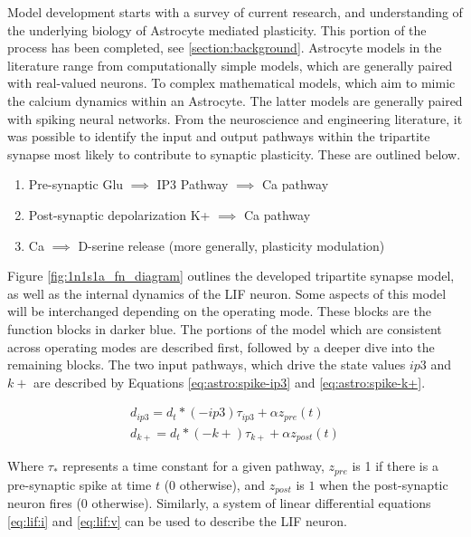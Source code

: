     Model development starts with a survey of current research, and
    understanding of the underlying biology of Astrocyte mediated
    plasticity. This portion of the process has been completed, see
    \ref{section:background}. Astrocyte models in the literature range from
    computationally simple models, which are generally paired with real-valued
    neurons. To complex mathematical models, which aim to mimic the calcium
    dynamics within an Astrocyte. The latter models are generally paired with
    spiking neural networks. From the neuroscience and engineering literature,
    it was possible to identify the input and output pathways within the
    tripartite synapse most likely to contribute to synaptic plasticity. These
    are outlined below.

    \begin{enumerate}
        \item Pre-synaptic Glu $\implies$ IP3 Pathway $\implies$ Ca pathway
        \item Post-synaptic depolarization K+ $\implies$ Ca pathway
        \item Ca $\implies$ D-serine release (more generally, plasticity modulation)
    \end{enumerate}


    Figure \ref{fig:1n1s1a_fn_diagram} outlines the developed tripartite synapse
    model, as well as the internal dynamics of the LIF neuron. Some aspects of
    this model will be interchanged depending on the operating mode. These
    blocks are the function blocks in darker blue. The portions of the model
    which are consistent across operating modes are described first, followed by
    a deeper dive into the remaining blocks. The two input pathways, which drive
    the state values $ip3$ and $k+$ are described by Equations
    \ref{eq:astro:spike-ip3} and \ref{eq:astro:spike-k+}.

    \begin{align}
      d_{ip3} = d_t * (-ip3)\tau_{ip3} + \alpha z_{pre}(t) \label{eq:astro:spike-ip3} \\
      d_{k+} = d_t * (-k+)\tau_{k+} + \alpha z_{post}(t) \label{eq:astro:spike-k+}
    \end{align}

    Where $\tau_*$ represents a time constant for a given pathway, $z_{pre}$ is
    1 if there is a pre-synaptic spike at time $t$ ($0$ otherwise), and
    $z_{post}$ is $1$ when the post-synaptic neuron fires ($0$
    otherwise). Similarly, a system of linear differential equations 
    \ref{eq:lif:i} and \ref{eq:lif:v} can be used to describe the LIF neuron.
    
